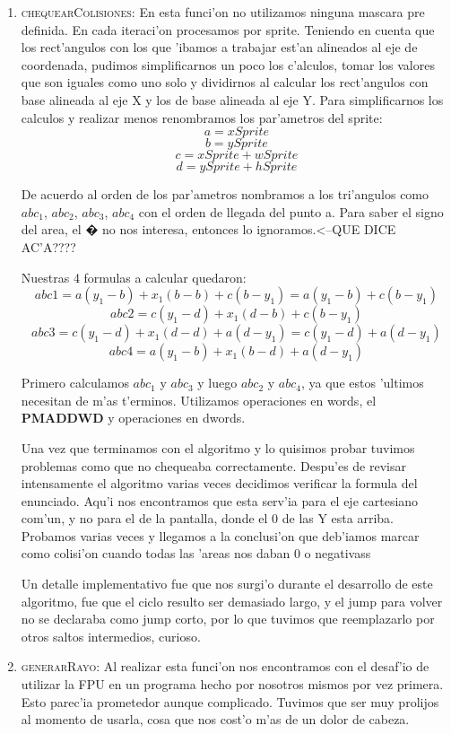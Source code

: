 \begin{enumerate}
\item \textsc{chequearColisiones}:
En esta funci'on no utilizamos ninguna mascara pre definida. En cada iteraci'on
procesamos por sprite. Teniendo en cuenta que los rect'angulos con los que
'ibamos a trabajar est'an alineados al eje de coordenada, pudimos simplificarnos
un poco los c'alculos, tomar los valores que son iguales como uno solo y
dividirnos al calcular los rect'angulos con base alineada al eje X y los de base
alineada al eje Y.
Para simplificarnos los calculos y realizar menos renombramos los par'ametros
del sprite:
$$a = xSprite$$
$$b = ySprite$$
$$c = xSprite + wSprite$$
$$d = ySprite + hSprite$$

De acuerdo al orden de los par'ametros nombramos a los tri'angulos como $abc_1$,
$abc_2$, $abc_3$, $abc_4$ con el orden de llegada del punto a.
Para saber el signo del area, el � no nos interesa, entonces lo
ignoramos.<--QUE DICE AC'A????

Nuestras 4 formulas a calcular quedaron:
$$abc1 = a(y_1 - b) + x_1(b - b) + c(b - y_1) = a(y_1 - b) + c(b - y_1)$$
$$abc2 = c(y_1 - d) + x_1(d - b) + c(b - y_1)$$
$$abc3 = c(y_1 - d) + x_1(d - d) + a(d - y_1) = c(y_1 - d) + a(d - y_1)$$
$$abc4 = a(y_1 - b) + x_1(b - d) + a(d - y_1)$$

Primero calculamos $abc_1$ y $abc_3$ y luego $abc_2$ y $abc_4$, ya que estos
'ultimos necesitan de m'as t'erminos. Utilizamos operaciones en words, el
\textbf{PMADDWD} y operaciones en dwords.

Una vez que terminamos con el algoritmo y lo quisimos probar tuvimos problemas
como que no chequeaba correctamente. Despu'es de revisar intensamente el
algoritmo varias veces decidimos verificar la formula del enunciado. Aqu'i nos
encontramos que esta serv'ia para el eje cartesiano com'un, y no para el de la
pantalla, donde el 0 de las Y esta arriba. Probamos varias veces y llegamos a
la conclusi'on que deb'iamos marcar como colisi'on cuando todas las 'areas nos
daban 0 o negativass

Un detalle implementativo fue que nos surgi'o durante el desarrollo de este
algoritmo, fue que el ciclo resulto ser demasiado largo, y el jump para volver
no se declaraba como jump corto, por lo que tuvimos que reemplazarlo por otros
saltos intermedios, curioso.


\item \textsc{generarRayo}:
	Al realizar esta funci'on nos encontramos con el desaf'io de utilizar la
FPU en un programa hecho por nosotros mismos por vez primera. Esto parec'ia
prometedor aunque complicado. Tuvimos que ser muy prolijos al momento de
usarla, cosa que nos cost'o m'as de un dolor de cabeza.


\end{enumerate}
